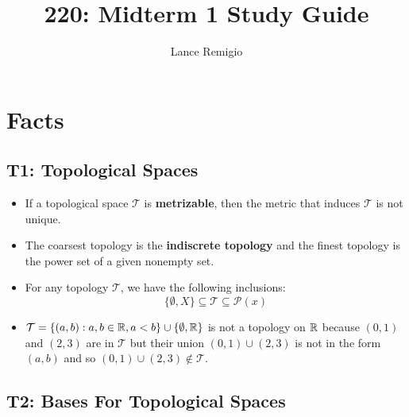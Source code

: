 \documentclass[a4paper]{article}
\title{220: Midterm 1 Study Guide}
\author{Lance Remigio}
\begin{document}
\maketitle

\section*{Facts}

\subsection*{T1: Topological Spaces}

\begin{eg}
    \begin{itemize}
    \item If a topological space \( \mathcal{T} \) is \textbf{metrizable}, then the metric that induces \( \mathcal{T} \) is not unique.
    \item The coarsest topology is the \textbf{indiscrete topology} and the finest topology is the power set of a given nonempty set.
    \item For any topology \( \mathcal{T} \), we have the following inclusions:
        \[   \{ \emptyset, X  \}  \subseteq \mathcal{T} \subseteq  \mathcal{P}(x)  \]
    \item \( \mathcal{T} = \{ (a,b) : a,b \in \mathbb{R} , a < b  \}  \cup \{ \emptyset, \mathbb{R}  \}  \) is not a topology on \( \mathbb{R}  \) because \( (0,1)  \) and \( (2,3) \) are in \( \mathcal{T} \) but their union \( (0,1) \cup (2,3) \) is not in the form \( (a,b) \) and so \( (0,1) \cup (2,3) \notin \mathcal{T} \).
    \end{itemize}
\end{eg}

\subsection*{T2: Bases For Topological Spaces}
\end{document}
